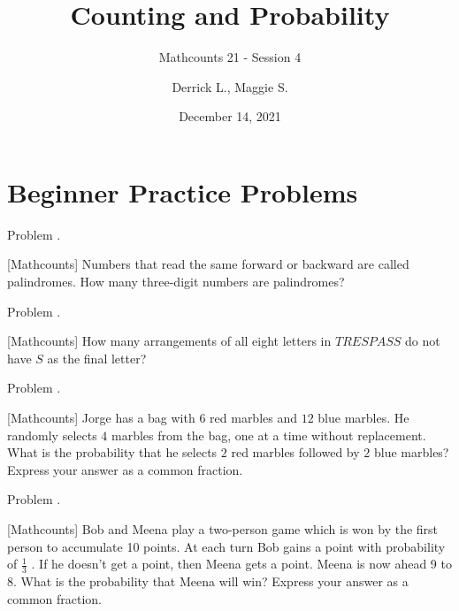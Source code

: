 \documentclass[9pt]{beamer}
\title{Counting and Probability}
\subtitle{Mathcounts 21 - Session 4}
\author{Derrick L., Maggie S.}
\institute{BISV Mathcounts Club 21}
\date{December 14, 2021}
\newcounter{problem}[section]
\begin{document}
\begin{frame}
    \titlepage        
\end{frame}

\setcounter{section}{4}

\section{Beginner Practice Problems}
\begin{frame}[t, fragile]{Problem \thesection.\theproblem}
    \begin{block}{}[Mathcounts]
 Numbers that read the same forward or backward are called palindromes. How many three-digit numbers are palindromes?
	
    \end{block}
\end{frame}

\begin{frame}[t, fragile]{Problem \thesection.\theproblem}
    \begin{block}{}[Mathcounts]
    How many arrangements of all eight letters in $TRESPASS$ do not have $S$ as the final letter?
	
    \end{block}
\end{frame}

\begin{frame}[t, fragile]{Problem \thesection.\theproblem}
    \begin{block}{}[Mathcounts]
    Jorge has a bag with $6$ red marbles and $12$ blue marbles. He randomly selects $4$ marbles from the bag, one at a time without replacement. What is the probability that he selects $2$ red marbles followed by $2$ blue marbles? Express your answer as a common fraction.

	
    \end{block}
\end{frame}

\begin{frame}[t, fragile]{Problem \thesection.\theproblem}
    \begin{block}{}[Mathcounts]
 Bob and Meena play a two-person game which is won by the first person to accumulate 10 points. At each turn Bob gains a point with probability of $\frac{1}{3}$ . If he doesn't get a point, then Meena gets a point. Meena is now ahead 9 to 8. What is the probability that Meena will win? Express your answer as a common fraction.
    \end{block}
\end{frame}
 
\end{document}
